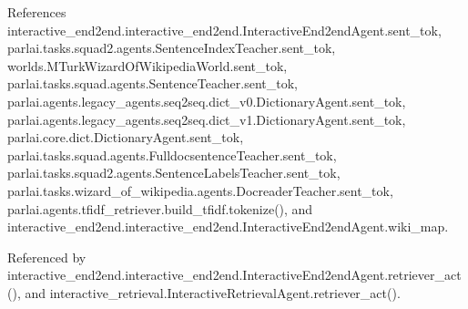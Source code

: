 References interactive\+\_\+end2end.\+interactive\+\_\+end2end.\+Interactive\+End2end\+Agent.\+sent\+\_\+tok, parlai.\+tasks.\+squad2.\+agents.\+Sentence\+Index\+Teacher.\+sent\+\_\+tok, worlds.\+M\+Turk\+Wizard\+Of\+Wikipedia\+World.\+sent\+\_\+tok, parlai.\+tasks.\+squad.\+agents.\+Sentence\+Teacher.\+sent\+\_\+tok, parlai.\+agents.\+legacy\+\_\+agents.\+seq2seq.\+dict\+\_\+v0.\+Dictionary\+Agent.\+sent\+\_\+tok, parlai.\+agents.\+legacy\+\_\+agents.\+seq2seq.\+dict\+\_\+v1.\+Dictionary\+Agent.\+sent\+\_\+tok, parlai.\+core.\+dict.\+Dictionary\+Agent.\+sent\+\_\+tok, parlai.\+tasks.\+squad.\+agents.\+Fulldocsentence\+Teacher.\+sent\+\_\+tok, parlai.\+tasks.\+squad2.\+agents.\+Sentence\+Labels\+Teacher.\+sent\+\_\+tok, parlai.\+tasks.\+wizard\+\_\+of\+\_\+wikipedia.\+agents.\+Docreader\+Teacher.\+sent\+\_\+tok, parlai.\+agents.\+tfidf\+\_\+retriever.\+build\+\_\+tfidf.\+tokenize(), and interactive\+\_\+end2end.\+interactive\+\_\+end2end.\+Interactive\+End2end\+Agent.\+wiki\+\_\+map.



Referenced by interactive\+\_\+end2end.\+interactive\+\_\+end2end.\+Interactive\+End2end\+Agent.\+retriever\+\_\+act(), and interactive\+\_\+retrieval.\+Interactive\+Retrieval\+Agent.\+retriever\+\_\+act().

